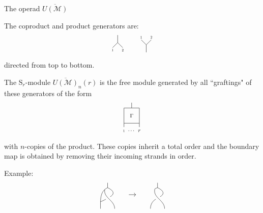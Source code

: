 \documentclass[10pt,t]{beamer} %
\renewcommand{\S}{\mathrm{S}}
\newcommand{\M}{\overline{U(\mathcal M)}}
\begin{document}
\begin{frame}{The operad $\M$}
	
	The coproduct and product generators are: \vspace*{-5pt}
	\begin{equation*}
	\begin{tikzpicture}[scale=.5]
	\draw (0,0)--(0,.75);
	\draw (0,0)--(.5,-.5);
	\draw (0,0)--(-.5,-.5);
	\node[scale=.5] at (-.5,-.75){1};
	\node[scale=.5] at (.5,-.75){2};
	\end{tikzpicture}
	\qquad
	\begin{tikzpicture}[scale=.5]
	\draw (0,0)--(0,-.75);
	\draw (0,0)--(.5,.5);
	\draw (0,0)--(-.5,.5);
	\node[scale=.5] at (-.5,.75){1};
	\node[scale=.5] at (.5,.75){2};
	\end{tikzpicture}
	\vspace*{-10pt}
	\end{equation*}
	directed from top to bottom.
	
	\pause \vspace*{10pt}
	
	The $\S_r$-module $\M_n(r)$ is the free module generated by all ``graftings" of these generators of the form \vspace*{-15pt}
	\begin{equation*}
	\begin{tikzpicture}[scale=.75]
	\draw (-.5,1)--(.5,1)--(.5,0)--(-.5,0)--(-.5,1);
	\node[scale=.75] at (0,.5){$\Gamma$};
	\draw (0,1)--(0,1.35);
	\draw (-.5,0)--(-.5,-.25);
	\node[scale=.5] at (-.5,-.5){1};
	\draw (.5,0)--(.5,-.25);
	\node[scale=.75] at (.5,-.5){$r$};
	\node[scale=.75] at (0,-.5){$\cdots$};
	\end{tikzpicture}
	\vspace*{-10pt}
	\end{equation*}
	with $n$-copies of the product. \pause These copies inherit a total order and the boundary map is obtained by removing their incoming strands in order. \vspace*{5pt}
	
	\textcolor{pblue}{Example:}
	\begin{equation*}
	\begin{tikzpicture}[scale=.35]
	\draw (1,3.7) to (1,3); 
	\draw (1,3) to [out=205, in=90] (0,0);
	\draw [shorten >= 0cm] (.6,2.73) to [out=-100, in=90] (2,0);
	\draw [shorten >= .15cm] (1,3) to [out=-25, in=30, distance=1.1cm] (1,1.5);
	\draw [shorten <= .1cm] (1,1.5) to [out=210, in=20] (0,1);
	
	\draw[->] (4,2) to (5,2);
	\end{tikzpicture}
	\qquad %
	\begin{tikzpicture}[scale=.35]
	\draw (1,3.7) to (1,3); 
	\draw (1,3) to [out=205, in=90] (.6,2.73);
	\draw [shorten >= 0cm] (.6,2.73) to [out=-100, in=90] (2,0);
	\draw [shorten >= .15cm] (1,3) to [out=-25, in=30, distance=1.1cm] (1,1.5);
	\draw [shorten <= .1cm] (1,1.5) to [out=210, in=90] (0,0);
	

\end{tikzpicture}
\end{equation*}
\end{frame}
\end{document}
